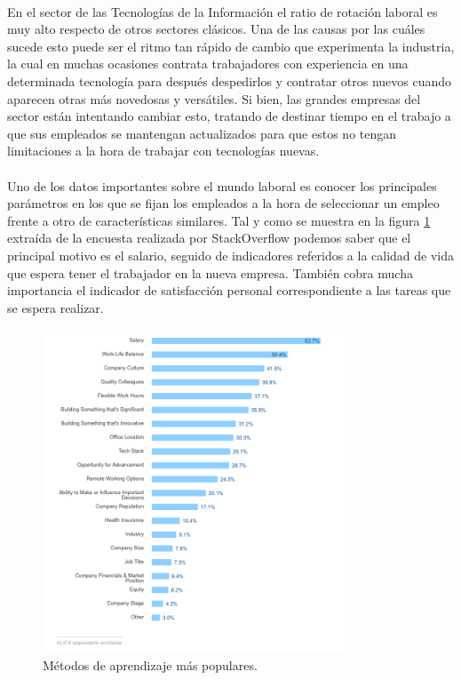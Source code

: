 \documentclass[12pt, a4paper]{report}
\begin{document}
            \paragraph{}
			En el sector de las Tecnologías de la Información el ratio de rotación laboral es muy alto respecto de otros sectores clásicos. Una de las causas por las cuáles sucede esto puede ser el ritmo tan rápido de cambio que experimenta la industria, la cual en muchas ocasiones contrata trabajadores con experiencia en una determinada tecnología para después despedirlos y contratar otros nuevos cuando aparecen otras más novedosas y versátiles. Si bien, las grandes empresas del sector están intentando cambiar esto, tratando de destinar tiempo en el trabajo a que sus empleados se mantengan actualizados para que estos no tengan limitaciones a la hora de trabajar con tecnologías nuevas. 


        	\paragraph{}
            Uno de los datos importantes sobre el mundo laboral es conocer los principales parámetros en los que se fijan los empleados a la hora de seleccionar un empleo frente a otro de características similares. Tal y como se muestra en la figura \ref{fig:job-priorities} extraída de la encuesta realizada por StackOverflow\cite{stackoverflow:survey} podemos saber que el principal motivo es el salario, seguido de indicadores referidos a la calidad  de vida que espera tener el trabajador en la nueva empresa. También cobra mucha importancia el indicador de satisfacción personal correspondiente a las tareas que se espera realizar.
            
             \begin{figure}[htb]
				\centering
				\includegraphics[width=0.8\textwidth]{images/stackoverflow-job-priorities}
				\caption{Métodos de aprendizaje más populares.\cite{stackoverflow:survey}} 		
                \label{fig:job-priorities}
			\end{figure}  
            
\end{document}
